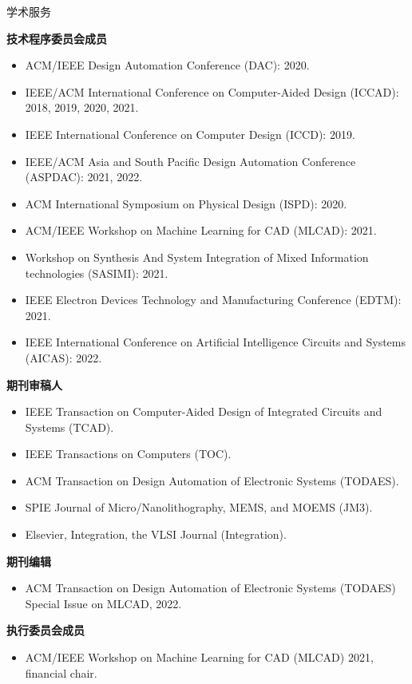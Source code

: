 
\begin{rSection}{学术服务}

\textbf{技术程序委员会成员}
\begin{itemize}
    \item ACM/IEEE Design Automation Conference (DAC): 2020.
    \item IEEE/ACM International Conference on Computer-Aided Design (ICCAD): 2018, 2019, 2020, 2021.
    \item IEEE International Conference on Computer Design (ICCD): 2019.
    \item IEEE/ACM Asia and South Pacific Design Automation Conference (ASPDAC): 2021, 2022.
    \item ACM International Symposium on Physical Design (ISPD): 2020.
    \item ACM/IEEE Workshop on Machine Learning for CAD (MLCAD): 2021.
    \item Workshop on Synthesis And System Integration of Mixed Information technologies (SASIMI): 2021.
    \item IEEE Electron Devices Technology and Manufacturing Conference (EDTM): 2021.
    \item IEEE International Conference on Artificial Intelligence Circuits and Systems (AICAS): 2022. 
\end{itemize}

\textbf{期刊审稿人}
\begin{itemize}
    \item IEEE Transaction on Computer-Aided Design of Integrated Circuits and Systems (TCAD).
    \item IEEE Transactions on Computers (TOC).
    \item ACM Transaction on Design Automation of Electronic Systems (TODAES).
    \item SPIE Journal of Micro/Nanolithography, MEMS, and MOEMS (JM3).
    \item Elsevier, Integration, the VLSI Journal (Integration).
\end{itemize}

\textbf{期刊编辑}
\begin{itemize}
    \item ACM Transaction on Design Automation of Electronic Systems (TODAES) Special Issue on MLCAD, 2022.
\end{itemize}

\textbf{执行委员会成员}
\begin{itemize}
    \item ACM/IEEE Workshop on Machine Learning for CAD (MLCAD) 2021, financial chair.
\end{itemize}

\end{rSection}


